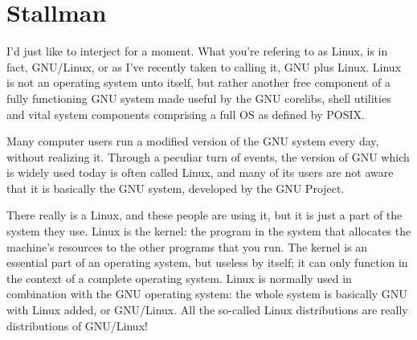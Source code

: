 \documentclass{article}
\begin{document}
\section{Stallman}

I'd just like to interject for a moment. What you're refering to as
Linux, is in fact, GNU/Linux, or as I've recently taken to calling it,
GNU plus Linux. Linux is not an operating system unto itself, but
rather another free component of a fully functioning GNU system made
useful by the GNU corelibs, shell utilities and vital system
components comprising a full OS as defined by POSIX.

Many computer users run a modified version of the GNU system every
day, without realizing it. Through a peculiar turn of events, the
version of GNU which is widely used today is often called Linux, and
many of its users are not aware that it is basically the GNU system,
developed by the GNU Project.

There really is a Linux, and these people are using it, but it is just
a part of the system they use. Linux is the kernel: the program in the
system that allocates the machine's resources to the other programs
that you run. The kernel is an essential part of an operating system,
but useless by itself; it can only function in the context of a
complete operating system. Linux is normally used in combination with
the GNU operating system: the whole system is basically GNU with Linux
added, or GNU/Linux. All the so-called Linux distributions are really
distributions of GNU/Linux!
\end{document}
